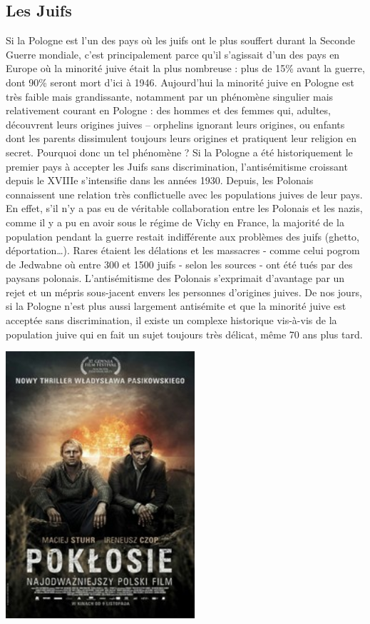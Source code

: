 \documentclass[12pt]{amsart}
\begin{document}
\begin{multicols}{2}
\section{Les Juifs}
Si la Pologne est l’un des pays où les juifs ont le plus souffert durant la Seconde Guerre mondiale, c’est principalement parce qu’il s’agissait d’un des pays en Europe où la minorité juive était la plus nombreuse : plus de 15\% avant la guerre, dont 90\%  seront mort d'ici à 1946. Aujourd’hui la minorité juive en Pologne est très faible mais grandissante, notamment par un phénomène singulier mais relativement courant en Pologne : des hommes et des femmes qui, adultes, découvrent leurs origines juives – orphelins ignorant leurs origines, ou enfants dont les parents dissimulent toujours leurs origines et pratiquent leur religion en secret. Pourquoi donc un tel phénomène ? Si la Pologne a été historiquement le premier pays à accepter les Juifs sans discrimination, l’antisémitisme croissant depuis le XVIIIe s'intensifie dans les années 1930. Depuis, les Polonais connaissent une relation très conflictuelle avec les populations juives de leur pays. En effet, s’il n’y a pas eu de véritable collaboration entre les Polonais et les nazis, comme il y a pu en avoir sous le régime de Vichy en France, la majorité de la population pendant la guerre restait indifférente aux problèmes des juifs (ghetto, déportation…). Rares étaient les délations et les massacres - comme celui pogrom de Jedwabne où entre 300 et 1500 juifs - selon les sources - ont été tués par des paysans polonais. L’antisémitisme des Polonais s’exprimait d'avantage par un rejet et un mépris sous-jacent envers les personnes d'origines juives. De nos jours, si la Pologne n’est plus aussi largement antisémite et que la minorité juive est acceptée sans discrimination, il existe un complexe historique vis-à-vis de la population juive qui en fait un sujet toujours très délicat, même 70 ans plus tard.

\begingroup
\centering

\includegraphics[width=7cm]{poklosie.jpg}


\end{multicols}
\end{document}
